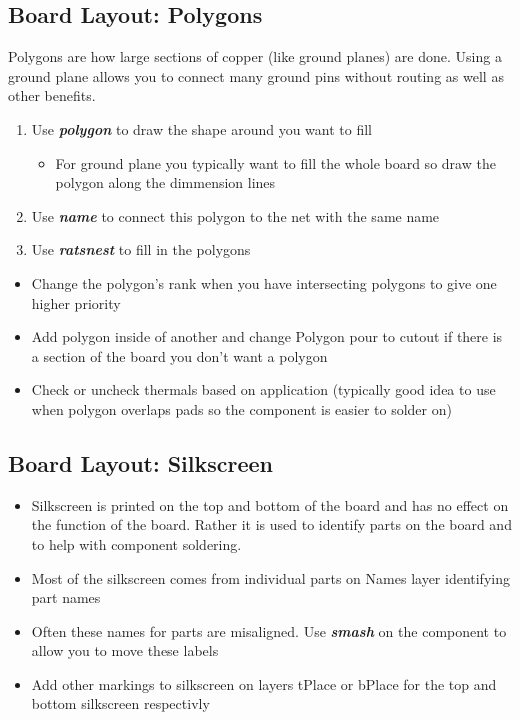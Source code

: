 \documentclass{article}
\begin{document}
\subsection{Board Layout: Polygons}
Polygons are how large sections of copper (like ground planes) are done. Using
a ground plane allows you to connect many ground pins without routing as well as
other benefits.
\begin{enumerate}
    \item Use \textit{\textbf{polygon}} to draw the shape around you want to
    fill
    \begin{itemize}
        \item For ground plane you typically want to fill the whole board so
        draw the polygon along the dimmension lines
    \end{itemize}
    \item Use \textit{\textbf{name}} to connect this polygon to the net with the
    same name
    \item Use \textit{\textbf{ratsnest}} to fill in the polygons
\end{enumerate}
\begin{tcolorbox} [title=Tips \& Tricks]
    \begin{itemize}
        \item Change the polygon's rank when you have intersecting polygons to
        give one higher priority
        \item Add polygon inside of another and change Polygon pour to cutout if
        there is a section of the board you don't want a polygon
        \item Check or uncheck thermals based on application (typically good
        idea to use when polygon overlaps pads so the component is easier to
        solder on)
    \end{itemize}
\end{tcolorbox}

\subsection{Board Layout: Silkscreen}
\begin{itemize}
    \item Silkscreen is printed on the top and bottom of the board and has no
    effect on the function of the board. Rather it is used to identify parts on
    the board and to help with component soldering.
    \item Most of the silkscreen comes from individual parts on Names layer
    identifying part names
    \item Often these names for parts are misaligned. Use
    \textit{\textbf{smash}} on the component to allow you to move these labels
    \item Add other markings to silkscreen on layers tPlace or bPlace for the
    top and bottom silkscreen respectivly
\end{itemize}
\end{document}
